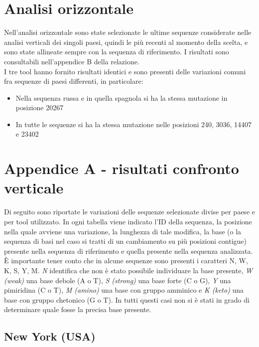 \documentclass[a4paper,10pt]{article}
\begin{document}
\section{Analisi orizzontale}

Nell'analisi orizzontale sono state selezionate le ultime sequenze considerate nelle analisi verticali dei singoli paesi, quindi le più recenti al momento della scelta, e sono state allineate sempre con la sequenza di riferimento. I risultati sono consultabili nell'appendice B della relazione.\\
I tre tool hanno fornito risultati identici e sono presenti delle variazioni comuni fra sequenze di paesi differenti, in particolare:
\begin{itemize}
\item Nella sequenza russa e in quella spagnola si ha la stessa mutazione in posizione 20267
\item In tutte le sequenze si ha la stessa mutazione nelle posizioni 240, 3036, 14407 e 23402
\end{itemize}


\newpage

\section{Appendice A - risultati confronto verticale}
Di seguito sono riportate le variazioni delle sequenze selezionate divise per paese e per tool utilizzato. In ogni tabella viene indicato l'ID della sequenza, la posizione nella quale avviene una variazione, la lunghezza di tale modifica, la base (o la sequenza di basi nel caso si tratti di un cambiamento su più posizioni contigue) presente nella sequenza di riferimento e quella presente nella sequenza analizzata. \\
È importante tener conto che in alcune sequenze sono presenti i caratteri {N, W, K, S, Y, M}. \textit{N} identifica che non è stato possibile individuare la base presente, \textit{W (weak)} una base debole (A o T), \textit{S (strong)} una base forte (C o G), \textit{Y} una pimiridina (C o T), \textit{M (amino)} una base con gruppo amminico e \textit{K (keto)} una base con gruppo chetonico (G o T). In tutti questi casi non si è stati in grado di determinare quale fosse la precisa base presente. \\


\subsection{New York (USA)}
\end{document}
